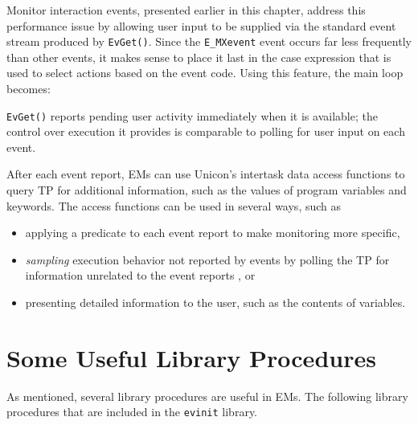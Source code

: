 Monitor interaction events, presented earlier in this chapter,
address this performance issue by allowing user input to be supplied
via the standard event stream produced by {\tt EvGet()}.
Since the {\tt E\_MXevent} event occurs far less
frequently than other events, it makes sense to place it last in the
case expression that is used to select actions based on the event
code.  Using this feature, the main loop becomes: 

 
{\tt EvGet()} reports pending user activity immediately when it is
available; the control over execution it provides is comparable to
polling for user input on each event.

After each event report, EMs can use Unicon's intertask data access
functions to query TP for additional information, such as the values
of program variables and keywords.  The access functions can be used
in several ways, such as

\begin{itemize}
\item applying a predicate to each event report to make monitoring
	more specific,
\item {\em sampling\/} execution behavior not reported by events by
	polling the TP for information unrelated to the event reports
	\cite{Ogle90}, or 
\item presenting detailed information to the user, such as the
	contents of variables.
\end{itemize}


\section{Some Useful Library Procedures}

As mentioned, several library procedures are useful in EMs.  The following
library procedures that are included in the {\tt evinit\/} library.


